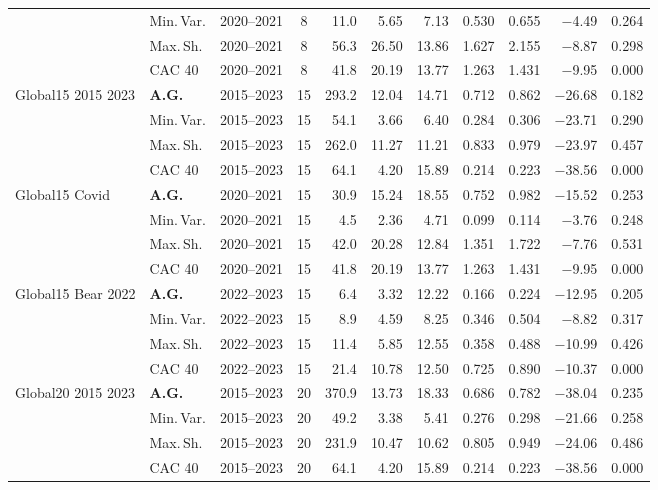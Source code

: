 \begin{longtable}{p{2.6cm} l c c r r r r r r r}
 & Min.\,Var. & 2020--2021 & 8 & 11.0 & 5.65 & 7.13 & 0.530 & 0.655 & $-$4.49 & 0.264 \\
 & Max.\,Sh. & 2020--2021 & 8 & 56.3 & 26.50 & 13.86 & 1.627 & 2.155 & $-$8.87 & 0.298 \\
 & CAC 40 & 2020--2021 & 8 & 41.8 & 20.19 & 13.77 & 1.263 & 1.431 & $-$9.95 & 0.000 \\
\midrule
Global15 2015 2023 & \textbf{A.G.} & 2015--2023 & 15 & 293.2 & 12.04 & 14.71 & 0.712 & 0.862 & $-$26.68 & 0.182 \\
 & Min.\,Var. & 2015--2023 & 15 & 54.1 & 3.66 & 6.40 & 0.284 & 0.306 & $-$23.71 & 0.290 \\
 & Max.\,Sh. & 2015--2023 & 15 & 262.0 & 11.27 & 11.21 & 0.833 & 0.979 & $-$23.97 & 0.457 \\
 & CAC 40 & 2015--2023 & 15 & 64.1 & 4.20 & 15.89 & 0.214 & 0.223 & $-$38.56 & 0.000 \\
\midrule
Global15 Covid & \textbf{A.G.} & 2020--2021 & 15 & 30.9 & 15.24 & 18.55 & 0.752 & 0.982 & $-$15.52 & 0.253 \\
 & Min.\,Var. & 2020--2021 & 15 & 4.5 & 2.36 & 4.71 & 0.099 & 0.114 & $-$3.76 & 0.248 \\
 & Max.\,Sh. & 2020--2021 & 15 & 42.0 & 20.28 & 12.84 & 1.351 & 1.722 & $-$7.76 & 0.531 \\
 & CAC 40 & 2020--2021 & 15 & 41.8 & 20.19 & 13.77 & 1.263 & 1.431 & $-$9.95 & 0.000 \\
\midrule
Global15 Bear 2022 & \textbf{A.G.} & 2022--2023 & 15 & 6.4 & 3.32 & 12.22 & 0.166 & 0.224 & $-$12.95 & 0.205 \\
 & Min.\,Var. & 2022--2023 & 15 & 8.9 & 4.59 & 8.25 & 0.346 & 0.504 & $-$8.82 & 0.317 \\
 & Max.\,Sh. & 2022--2023 & 15 & 11.4 & 5.85 & 12.55 & 0.358 & 0.488 & $-$10.99 & 0.426 \\
 & CAC 40 & 2022--2023 & 15 & 21.4 & 10.78 & 12.50 & 0.725 & 0.890 & $-$10.37 & 0.000 \\
\midrule
Global20 2015 2023 & \textbf{A.G.} & 2015--2023 & 20 & 370.9 & 13.73 & 18.33 & 0.686 & 0.782 & $-$38.04 & 0.235 \\
 & Min.\,Var. & 2015--2023 & 20 & 49.2 & 3.38 & 5.41 & 0.276 & 0.298 & $-$21.66 & 0.258 \\
 & Max.\,Sh. & 2015--2023 & 20 & 231.9 & 10.47 & 10.62 & 0.805 & 0.949 & $-$24.06 & 0.486 \\
 & CAC 40 & 2015--2023 & 20 & 64.1 & 4.20 & 15.89 & 0.214 & 0.223 & $-$38.56 & 0.000 \\
\midrule

\end{longtable}
